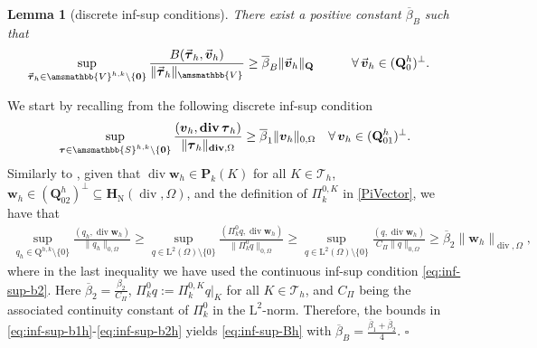 \documentclass[fleqn,a4paper]{cas-sc}
\newcommand\vdiv{\mathop{\mathrm{div}}\nolimits}
\newcommand\bdiv{\mathop{\mathbf{div}}\nolimits}
\newcommand{\bbS}{\amsmathbb{S}}
\newcommand{\Om}{\Omega}
\newcommand{\bv}{\boldsymbol{v}}
\newcommand{\bw}{\boldsymbol{w}}
\newcommand{\0}{\boldsymbol{0}}
\newcommand\cT{\mathcal{T}}
\newcommand\bP{\mathbf{P}}
\newcommand\bQ{\mathbf{Q}}
\newcommand\rQ{\mathrm{Q}}
\newcommand\bbV{\amsmathbb{V}}
\newcommand\bH{\mathbf{H}}
\newcommand\rL{\mathrm{L}}
\newcommand\btau{\boldsymbol{\tau}}
\numberwithin{equation}{section}
\numberwithin{figure}{section}
\newtheorem{lemma}[theorem]{Lemma}
\newenvironment{proof}{\noindent{\it Proof.}}{\hfill$\square$}
\begin{document}
{\begin{lemma}[discrete inf-sup conditions]\label{lemma:inf-sup-B_h}
There exist a positive constant $\overline{\beta}_B$ such that
\begin{alignat}{2}
    \sup_{ \vec{\btau}_h \in \bbV^{h,k}\setminus\{\boldsymbol{0}\}}\frac{ B (\vec{\btau}_h, \vec{\bv}_h)}{\|\vec{\btau}_h\|_{\bbV}} & \geq  \overline{\beta}_{B} \|\vec{\bv}_h\|_{\bQ} \qquad &&\forall \, \vec{\bv}_h \in (\bQ_0^h)^{\perp}.\label{eq:inf-sup-Bh}
\end{alignat}    
\end{lemma}
\begin{proof}
    We start by recalling from \cite[Proposition 5.6]{artioli17b} the following discrete inf-sup condition
    \begin{align}\label{eq:inf-sup-b1h}
        \sup_{\btau \in \bbS^{h,k} \setminus \{\mathbf{0}\}}\frac{  (\bv_h, \bdiv \btau_h)}{\|\btau_h\|_{\bdiv,\Omega}}  \geq  \overline{\beta}_{1} \|\bv_h\|_{0,\Om} \quad \forall \, \bv_h \in (\bQ_{01}^h)^{\perp}.
    \end{align}
    Similarly to \cite[Proposition 5.4.2]{boffi13}, given that $\vdiv \bw_h \in \bP_{k}(K)$ for all $K\in \cT_h$, $\bw_h\in (\bQ_{02}^h)^\perp\subseteq \bH_\mathrm{N}(\vdiv,\Omega)$, and the definition of $\Pi_{k}^{0,K}$ in \eqref{PiVector}, we have that 
    \begin{align}\label{eq:inf-sup-b2h}
        \sup_{q_h\in \rQ^{h,k}\setminus\{0\}} \frac{(q_h,\vdiv \bw_h)}{\|q_h\|_{0,\Omega}} \geq \sup_{q\in \rL^{2}(\Omega)\setminus\{0\}} \frac{(\Pi_{k}^{0}q,\vdiv \bw_h)}{\|\Pi_{k}^{0}q\|_{0,\Omega}} \geq \sup_{q\in \rL^{2}(\Omega)\setminus\{0\}} \frac{(q,\vdiv \bw_h)}{C_\Pi\|q\|_{0,\Omega}} \geq \overline{\beta}_2 \|\bw_h\|_{\vdiv,\Omega},
    \end{align}
  where in the last inequality we have used the continuous inf-sup condition  \eqref{eq:inf-sup-b2}. Here  $\overline{\beta}_2 = \frac{\beta_2}{C_\Pi}$, $\Pi_{k}^{0}q := \Pi_{k}^{0,K}q|_K$ for all $K\in \cT_h$, and $C_\Pi$ being the associated continuity constant of $\Pi_{k}^{0}$ in the $\rL^2$-norm. Therefore, the bounds in \eqref{eq:inf-sup-b1h}-\eqref{eq:inf-sup-b2h} yields \eqref{eq:inf-sup-Bh} with $\overline{\beta}_{B} = \frac{\overline{\beta}_1+\overline{\beta}_2}{4}$.
\end{proof}}
\end{document}
